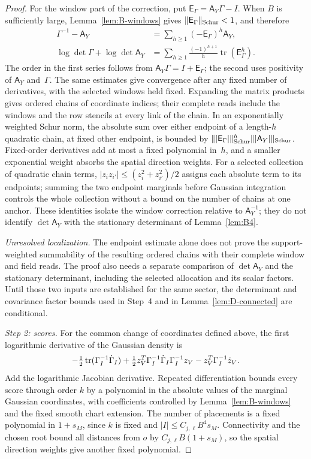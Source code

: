 \begin{proof}
For the window part of the correction, put $\mathsf E_\Gamma=\mathsf A_Y\Gamma-I$. When $B$ is sufficiently large, Lemma~\ref{lem:B-windows} gives $\|\mathsf E_\Gamma\|_{\rm Schur}<1$, and therefore
\begin{align*}
\Gamma^{-1}-\mathsf A_Y
 &=\sum_{h\ge1}(-\mathsf E_\Gamma)^h\mathsf A_Y,\\
\log\det\Gamma+\log\det\mathsf A_Y
 &=\sum_{h\ge1}\frac{(-1)^{h+1}}{h}\operatorname{tr}(\mathsf E_\Gamma^h).
\end{align*}
The order in the first series follows from $\mathsf A_Y\Gamma=I+\mathsf E_\Gamma$; the second uses positivity of $\mathsf A_Y$ and~$\Gamma$. The same estimates give convergence after any fixed number of derivatives, with the selected windows held fixed. Expanding the matrix products gives ordered chains of coordinate indices; their complete reads include the windows and the row stencils at every link of the chain. In an exponentially weighted Schur norm, the absolute sum over either endpoint of a length-$h$ quadratic chain, at fixed other endpoint, is bounded by $\||\mathsf E_\Gamma|\|_{\rm Schur}^h\||\mathsf A_Y|\|_{\rm Schur}$. Fixed-order derivatives add at most a fixed polynomial in~$h$, and a smaller exponential weight absorbs the spatial direction weights. For a selected collection of quadratic chain terms, $|z_i z_{i'}|\le(z_i^2+z_{i'}^2)/2$ assigns each absolute term to its endpoints; summing the two endpoint marginals before Gaussian integration controls the whole collection without a bound on the number of chains at one anchor. These identities isolate the window correction relative to $\mathsf A_Y^{-1}$; they do not identify $\det\mathsf A_Y$ with the stationary determinant of Lemma~\ref{lem:B4}.

\emph{Unresolved localization.} The endpoint estimate alone does not prove the support-weighted summability of the resulting ordered chains with their complete window and field reads. The proof also needs a separate comparison of $\det\mathsf A_Y$ and the stationary determinant, including the selected allocation and its scalar factors. Until those two inputs are established for the same sector, the determinant and covariance factor bounds used in Step~4 and in Lemma~\ref{lem:D-connected} are conditional.

\emph{Step 2: scores.} For the common change of coordinates defined above, the first logarithmic derivative of the Gaussian density is
\begin{equation*}
-\tfrac12\operatorname{tr}(\Gamma_I^{-1}\dot \Gamma_I)
+\tfrac12z_V^T\Gamma_I^{-1}\dot \Gamma_I\Gamma_I^{-1}z_V
-z_V^T\Gamma_I^{-1}\dot z_V.
\end{equation*}
Add the logarithmic Jacobian derivative. Repeated differentiation bounds every score through order $k$ by a polynomial in the absolute values of the marginal Gaussian coordinates, with coefficients controlled by Lemma~\ref{lem:B-windows} and the fixed smooth chart extension. The number of placements is a fixed polynomial in $1+s_M$, since $k$ is fixed and $|I|\le C_{j,\ell}B^4s_M$. Connectivity and the chosen root bound all distances from $o$ by $C_{j,\ell}B(1+s_M)$, so the spatial direction weights give another fixed polynomial.


\end{proof}

